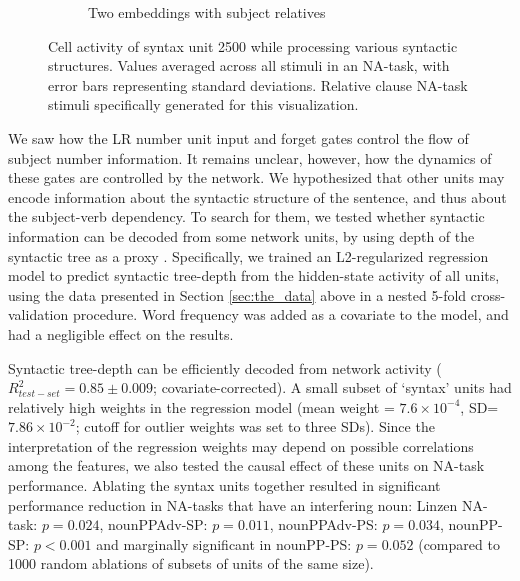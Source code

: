 \begin{figure}[t]
\begin{subfigure}{\textwidth}
            \caption{Two embeddings with subject relatives}
            \label{fig:syntax-unit-double-subjrel}
    \end{subfigure}
\caption{Cell activity of syntax unit \unit{2}{500} while processing various syntactic structures. Values averaged across all stimuli in an NA-task, with error bars representing standard deviations. Relative clause NA-task stimuli specifically generated for this visualization. }
\end{figure}

We saw how the LR number unit input and forget gates control the flow
of subject number information. It remains unclear, however, how the dynamics of these gates are controlled by the network. We hypothesized
that other units may encode information about the syntactic structure
of the sentence, and thus about the subject-verb dependency. To
search for them, we tested whether syntactic information can be
decoded from some network units, by using depth of the
syntactic tree as a proxy \cite{Nelson:etal:2017}. Specifically, we
trained an L2-regularized regression model to predict syntactic
tree-depth from the hidden-state activity of all units, using the data
presented in Section \ref{sec:the_data} above in a nested 5-fold
cross-validation procedure. %
Word frequency was added as a covariate
to the model, and had a negligible effect on the results.

Syntactic tree-depth can be efficiently decoded from network activity
($R^2_{test-set}=0.85\pm0.009$; covariate-corrected). A small subset of `syntax' units had relatively high weights in the regression model (mean weight = $7.6\times{}10^{-4}$, SD=$7.86\times{}10^{-2}$; cutoff for outlier weights was set to three SDs). Since the interpretation of the regression weights may depend on possible correlations among the features, we also tested the causal effect of these units on NA-task performance. Ablating the syntax units together resulted in significant performance reduction in NA-tasks that have an interfering noun: Linzen NA-task: $p=0.024$, nounPPAdv-SP: $p=0.011$, nounPPAdv-PS: $p=0.034$, nounPP-SP: $p<0.001$ and marginally significant in nounPP-PS: $p=0.052$ (compared to 1000 random ablations of subsets of units of the same size).

